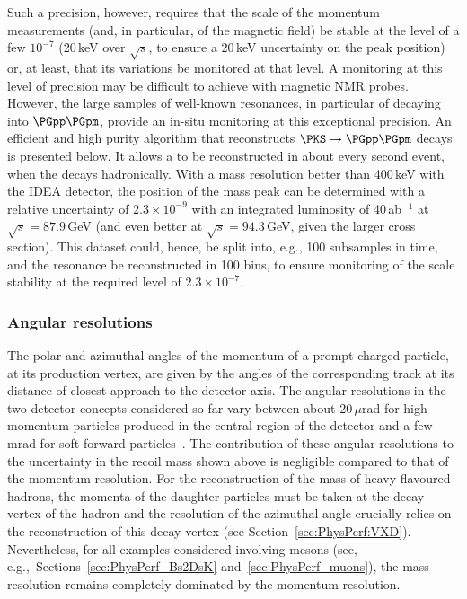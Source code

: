 Such a precision, however, requires that the scale of the momentum measurements 
(and, in particular, of the magnetic field) 
be stable at the level of a few $10^{-7}$ (20\,keV over $\sqrt{s}$, to ensure a 20\,keV uncertainty on the peak position) 
or, at least, that its variations be monitored at that level. 
A monitoring at this level of precision may be difficult to achieve with magnetic NMR probes. 
However, the large samples of well-known resonances, 
in particular of \PKS decaying into $\PGpp\PGpm$, provide an in-situ monitoring at this exceptional precision. 
An efficient and high purity algorithm that reconstructs $\PKS \to \PGpp\PGpm$ decays is presented below. 
It allows a \PKS to be reconstructed in about every second \PZ event, when the \PZ decays hadronically. 
With a mass resolution better than 400\,keV with the IDEA detector, 
the position of the \PKS mass peak can be determined with a relative uncertainty of $2.3 \times 10^{-9}$ 
with an integrated luminosity of 40\,ab$^{-1}$ at $\sqrt{s} = 87.9$\,GeV 
(and even better at $\sqrt{s} = 94.3$\,GeV, given the larger cross section). 
This dataset could, hence, be split into, e.g., 100 subsamples in time, 
and the \PKS resonance be reconstructed in 100 bins, 
to ensure monitoring of the scale stability at the required level of $2.3 \times 10^{-7}$.

\subsubsection{Angular resolutions}
\label{sec:PhysPerf_TrackAngles}

The polar and azimuthal angles of the momentum of a prompt charged particle, at its production vertex, 
are given by the angles of the corresponding track at its distance of closest approach to the detector axis.
The angular resolutions in the two detector concepts considered so far vary between 
about 20\,$\mu$rad for high momentum particles produced in the central region of the detector and a few mrad for soft forward particles~\cite{Bacchetta:2019fmz, softwareNote}. 
The contribution of these angular resolutions to the uncertainty in the recoil mass shown above is negligible compared to that of the momentum resolution. 
For the reconstruction of the mass of heavy-flavoured hadrons, 
the momenta of the daughter particles must be taken at the decay vertex of the hadron 
and the resolution of the azimuthal angle crucially relies on the reconstruction of this decay vertex (see Section~\ref{sec:PhysPerf:VXD}). 
Nevertheless, for all examples considered involving \PB mesons 
(see, e.g.,\ Sections~\ref{sec:PhysPerf_Bs2DsK} and~\ref{sec:PhysPerf_muons}), 
the mass resolution remains completely dominated by the momentum resolution.

